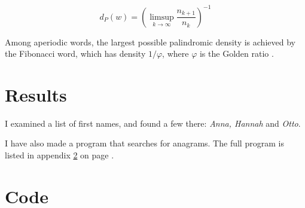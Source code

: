 \documentclass[thesis]{cluu}
\begin{document}
\begin{equation}
  d_P(w) =
  \left(\limsup\limits_{k\rightarrow\infty}\frac{n_{k+1}}{n_k} \right)^{-1}
\end{equation}

Among aperiodic words, the largest possible palindromic density is
achieved by the Fibonacci word, which has density \( 1/\varphi \), where
\( \varphi \)  is the Golden ratio \parencite[443]{adamczewski10}.

\chapter{Results}
\label{chap:results}

I examined a list of first names, and found a few there:
\emph{Anna, Hannah} and \emph{Otto}.

I have also made a program that searches for anagrams. The full
program is listed in appendix \ref{chap:code} on page
\pageref{chap:code}.

\appendix
\chapter{Code}
\label{chap:code}


\printbibliography
\end{document}
